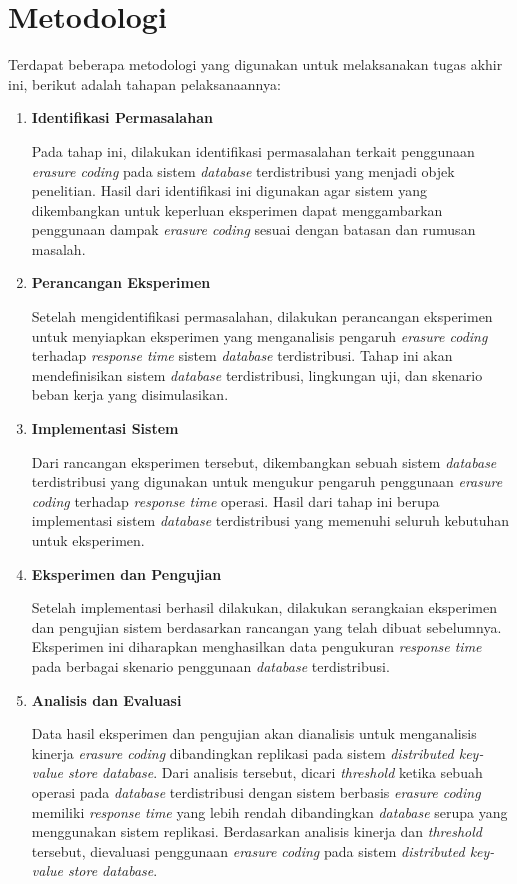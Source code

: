\section{Metodologi}
\label{sec:metodologi}

Terdapat beberapa metodologi yang digunakan untuk melaksanakan tugas akhir ini, berikut adalah tahapan pelaksanaannya:

\begin{enumerate}
	\item \textbf{Identifikasi Permasalahan}

	      Pada tahap ini, dilakukan identifikasi permasalahan terkait penggunaan \textit{erasure coding} pada sistem \textit{database} terdistribusi yang menjadi objek penelitian. Hasil dari identifikasi ini digunakan agar sistem yang dikembangkan untuk keperluan eksperimen dapat menggambarkan penggunaan dampak \textit{erasure coding} sesuai dengan batasan dan rumusan masalah.

	\item \textbf{Perancangan Eksperimen}

	      Setelah mengidentifikasi permasalahan, dilakukan perancangan eksperimen untuk menyiapkan eksperimen yang menganalisis pengaruh \textit{erasure coding} terhadap \textit{response time} sistem \textit{database} terdistribusi. Tahap ini akan mendefinisikan sistem \textit{database} terdistribusi, lingkungan uji, dan skenario beban kerja yang disimulasikan.

	\item \textbf{Implementasi Sistem}

	      Dari rancangan eksperimen tersebut, dikembangkan sebuah sistem \textit{database} terdistribusi yang digunakan untuk mengukur pengaruh penggunaan \textit{erasure coding} terhadap \textit{response time} operasi. Hasil dari tahap ini berupa implementasi sistem \textit{database} terdistribusi yang memenuhi seluruh kebutuhan untuk eksperimen.

	\item \textbf{Eksperimen dan Pengujian}

	      Setelah implementasi berhasil dilakukan, dilakukan serangkaian eksperimen dan pengujian sistem berdasarkan rancangan yang telah dibuat sebelumnya. Eksperimen ini diharapkan menghasilkan data pengukuran \textit{response time} pada berbagai skenario penggunaan \textit{database} terdistribusi.

	\item \textbf{Analisis dan Evaluasi}

	      Data hasil eksperimen dan pengujian akan dianalisis untuk menganalisis kinerja \textit{erasure coding} dibandingkan replikasi pada sistem \textit{distributed key-value store database}. Dari analisis tersebut, dicari \textit{threshold} ketika sebuah operasi pada \textit{database} terdistribusi dengan sistem berbasis \textit{erasure coding} memiliki \textit{response time} yang lebih rendah dibandingkan \textit{database} serupa yang menggunakan sistem replikasi. Berdasarkan analisis kinerja dan \textit{threshold} tersebut, dievaluasi penggunaan \textit{erasure coding} pada sistem \textit{distributed key-value store database}.

\end{enumerate}
